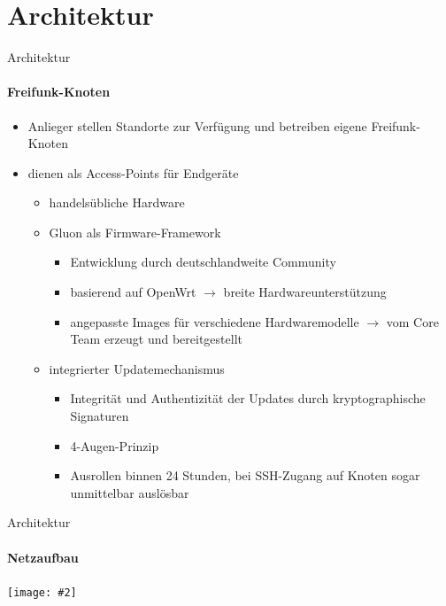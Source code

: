 \documentclass[]{beamer}
\newcommand{\centeredimage}[2][ ]{
        \begin{center}
            \texttt{[image: \#2]} $\;$

            \tiny{#1}
        \end{center}
}
\begin{document}
\section{Architektur}
\begin{frame}{Architektur}
\framesubtitle{Freifunk-Knoten}
\begin{itemize}
	\item Anlieger stellen Standorte zur Verfügung und betreiben eigene Freifunk-Knoten \pause
	\item dienen als Access-Points für Endgeräte \pause
	\begin{itemize}
		\item handelsübliche Hardware \pause
		\item Gluon als Firmware-Framework \pause
		\begin{itemize}
			\item Entwicklung durch deutschlandweite Community \pause
			\item basierend auf OpenWrt $\rightarrow$ breite Hardwareunterstützung \pause
			\item angepasste Images für verschiedene Hardwaremodelle  \pause \newline $\rightarrow$ vom Core Team erzeugt und bereitgestellt \pause
		\end{itemize}
		\item integrierter Updatemechanismus \pause
		\begin{itemize}
			\item Integrität und Authentizität der Updates durch kryptographische Signaturen \pause
			\item 4-Augen-Prinzip \pause
			\item Ausrollen binnen 24 Stunden, bei SSH-Zugang auf Knoten sogar unmittelbar auslösbar
		\end{itemize}
	\end{itemize}
\end{itemize}
\end{frame}


\begin{frame}{Architektur}
\framesubtitle{Netzaufbau}
\centeredimage{images/network_layout}
\end{frame}
\end{document}
